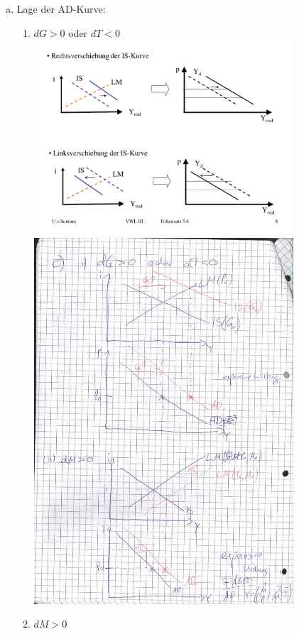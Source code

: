 \documentclass{scrartcl}
\begin{document}
\begin{enumerate}[a)]
  \item Lage der AD-Kurve:
  \begin{enumerate}
    \item $dG >0$ oder $dT<0$\\
      \includegraphics[width=0.8\textwidth]{Bilder/ADLage1.pdf}\\
      \includegraphics[width=0.8\textwidth]{Bilder/ADLage11.pdf}\\
    \item $dM >0$\\

\end{enumerate}
\end{enumerate}
\end{document}
